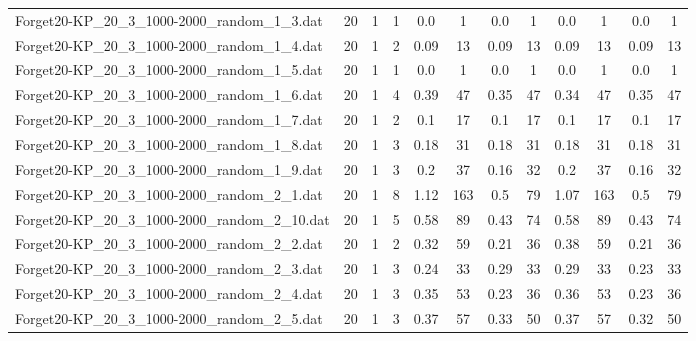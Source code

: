 \begin{sidewaystable}[!ht]
{\begin{tabular}{lccccccccccc}
Forget20-KP\_20\_3\_1000-2000\_random\_1\_3.dat & 20 & 1 & 1 &  \textcolor{blue2}{0.0} & 1 &  \textcolor{blue2}{0.0} & 1 &  \textcolor{blue2}{0.0} & 1 &  \textcolor{blue2}{0.0} & 1 \\
Forget20-KP\_20\_3\_1000-2000\_random\_1\_4.dat & 20 & 1 & 2 &  \textcolor{blue2}{0.09} & 13 &  \textcolor{blue2}{0.09} & 13 &  \textcolor{blue2}{0.09} & 13 &  \textcolor{blue2}{0.09} & 13 \\
Forget20-KP\_20\_3\_1000-2000\_random\_1\_5.dat & 20 & 1 & 1 &  \textcolor{blue2}{0.0} & 1 &  \textcolor{blue2}{0.0} & 1 &  \textcolor{blue2}{0.0} & 1 &  \textcolor{blue2}{0.0} & 1 \\
Forget20-KP\_20\_3\_1000-2000\_random\_1\_6.dat & 20 & 1 & 4 & 0.39 & 47 & 0.35 & 47 &  \textcolor{blue2}{0.34} & 47 & 0.35 & 47 \\
Forget20-KP\_20\_3\_1000-2000\_random\_1\_7.dat & 20 & 1 & 2 &  \textcolor{blue2}{0.1} & 17 &  \textcolor{blue2}{0.1} & 17 &  \textcolor{blue2}{0.1} & 17 &  \textcolor{blue2}{0.1} & 17 \\
Forget20-KP\_20\_3\_1000-2000\_random\_1\_8.dat & 20 & 1 & 3 &  \textcolor{blue2}{0.18} & 31 &  \textcolor{blue2}{0.18} & 31 &  \textcolor{blue2}{0.18} & 31 &  \textcolor{blue2}{0.18} & 31 \\
Forget20-KP\_20\_3\_1000-2000\_random\_1\_9.dat & 20 & 1 & 3 & 0.2 & 37 &  \textcolor{blue2}{0.16} & 32 & 0.2 & 37 &  \textcolor{blue2}{0.16} & 32 \\
Forget20-KP\_20\_3\_1000-2000\_random\_2\_1.dat & 20 & 1 & 8 & 1.12 & 163 &  \textcolor{blue2}{0.5} & 79 & 1.07 & 163 &  \textcolor{blue2}{0.5} & 79 \\
Forget20-KP\_20\_3\_1000-2000\_random\_2\_10.dat & 20 & 1 & 5 & 0.58 & 89 &  \textcolor{blue2}{0.43} & 74 & 0.58 & 89 &  \textcolor{blue2}{0.43} & 74 \\
Forget20-KP\_20\_3\_1000-2000\_random\_2\_2.dat & 20 & 1 & 2 & 0.32 & 59 &  \textcolor{blue2}{0.21} & 36 & 0.38 & 59 &  \textcolor{blue2}{0.21} & 36 \\
Forget20-KP\_20\_3\_1000-2000\_random\_2\_3.dat & 20 & 1 & 3 & 0.24 & 33 & 0.29 & 33 & 0.29 & 33 &  \textcolor{blue2}{0.23} & 33 \\
Forget20-KP\_20\_3\_1000-2000\_random\_2\_4.dat & 20 & 1 & 3 & 0.35 & 53 &  \textcolor{blue2}{0.23} & 36 & 0.36 & 53 &  \textcolor{blue2}{0.23} & 36 \\
Forget20-KP\_20\_3\_1000-2000\_random\_2\_5.dat & 20 & 1 & 3 & 0.37 & 57 & 0.33 & 50 & 0.37 & 57 &  \textcolor{blue2}{0.32} & 50 \\

\end{tabular}}
\end{sidewaystable}

